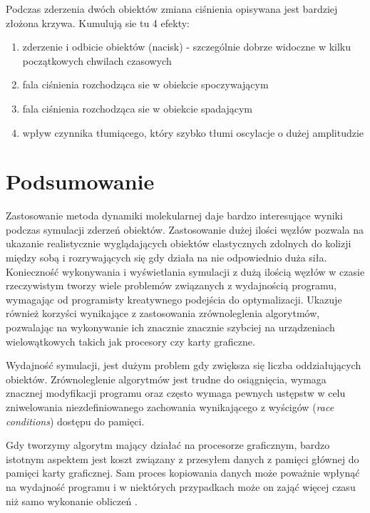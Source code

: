 \documentclass[12pt, letterpaper]{report}
\begin{document}
    Podczas zderzenia dwóch obiektów zmiana ciśnienia opisywana jest bardziej złożona krzywa.
    Kumulują sie tu 4 efekty:

    \begin{enumerate}
        \item zderzenie i odbicie obiektów (nacisk) - szczególnie dobrze widoczne w kilku początkowych chwilach czasowych
        \item fala ciśnienia rozchodząca sie w obiekcie spoczywającym
        \item fala ciśnienia rozchodząca sie w obiekcie spadającym 
        \item wpływ czynnika tłumiącego, który szybko tłumi oscylacje o dużej amplitudzie
    \end{enumerate}

\chapter{Podsumowanie}
    Zastosowanie metoda dynamiki molekularnej daje bardzo interesujące 
    wyniki podczas symulacji zderzeń obiektów. Zastosowanie dużej ilości węzłów pozwala na 
    ukazanie realistycznie wyglądających obiektów elastycznych zdolnych do kolizji między sobą 
    i rozrywających się gdy działa na nie odpowiednio duża siła. \\
    
    Konieczność wykonywania i wyświetlania symulacji z dużą ilością węzłów w czasie 
    rzeczywistym tworzy wiele problemów związanych z wydajnością programu, wymagając
    od programisty kreatywnego podejścia do optymalizacji. Ukazuje również korzyści wynikające z 
    zastosowania zrównoleglenia algorytmów, pozwalając na wykonywanie ich znacznie znacznie szybciej na 
    urządzeniach wielowątkowych takich jak procesory czy karty graficzne.

    Wydajność symulacji, jest dużym problem gdy zwiększa się liczba oddziałujących obiektów. 
    Zrównoleglenie algorytmów jest trudne do osiągnięcia, wymaga znacznej modyfikacji programu oraz często 
    wymaga pewnych ustępstw w celu zniwelowania niezdefiniowanego zachowania wynikającego z wyścigów 
    (\emph{race conditions}) dostępu do pamięci.

    Gdy tworzymy algorytm mający działać na procesorze graficznym, bardzo istotnym aspektem jest 
    koszt związany z przesyłem danych z pamięci głównej do pamięci karty graficznej. Sam proces kopiowania 
    danych może poważnie wpłynąć na wydajność programu i w niektórych przypadkach może on zająć więcej
    czasu niż samo wykonanie obliczeń \cite{cuda}. \\
\end{document}
